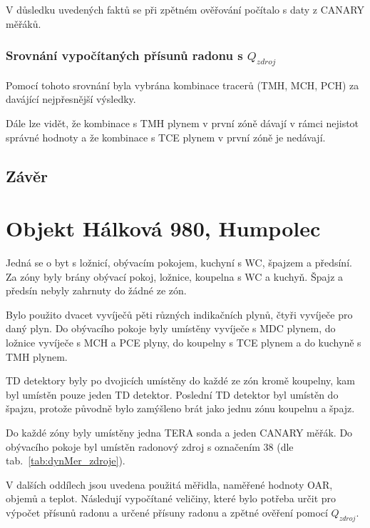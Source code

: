 V důsledku uvedených faktů se při zpětném ověřování počítalo s daty z CANARY měřáků.

\subsubsection{Srovnání vypočítaných přísunů radonu s $Q_{zdroj}$}
Pomocí tohoto srovnání byla vybrána kombinace tracerů (TMH, MCH, PCH) za davájící nejpřesnější výsledky. 

Dále lze vidět, že kombinace s TMH plynem v první zóně dávají v rámci nejistot správné hodnoty a že kombinace s TCE plynem v první zóně je nedávají.

\subsection{Závěr}

\section{Objekt Hálková 980, Humpolec}
Jedná se o byt s ložnicí, obývacím pokojem, kuchyní s WC, špajzem a předsíní. Za zóny byly brány obývací pokoj, ložnice, koupelna s WC a kuchyň. Špajz a předsín nebyly zahrnuty do žádné ze zón.

Bylo použito dvacet vyvíječů pěti různých indikačních plynů, čtyři vyvíječe pro daný plyn. Do obývacího pokoje byly umístěny vyvíječe s MDC plynem, do ložnice vyvíječe s MCH a PCE plyny, do koupelny s TCE plynem a do kuchyně s TMH plynem.

TD detektory byly po dvojicích umístěny do každé ze zón kromě koupelny, kam byl umístěn pouze jeden TD detektor. Poslední TD detektor byl umístěn do špajzu, protože původně bylo zamýšleno brát jako jednu zónu koupelnu a špajz. %

Do každé zóny byly umístěny jedna TERA sonda a jeden CANARY měřák. Do obývacího pokoje byl umístěn radonový zdroj s označením 38 (dle tab.~\ref{tab:dynMer_zdroje}). 

V dalších oddílech jsou uvedena použitá měřidla, naměřené hodnoty OAR, objemů a teplot. Následují vypočítané veličiny, které bylo potřeba určit pro výpočet přísunů radonu a určené přísuny radonu a zpětné ověření pomocí $Q_{zdroj}$.  

